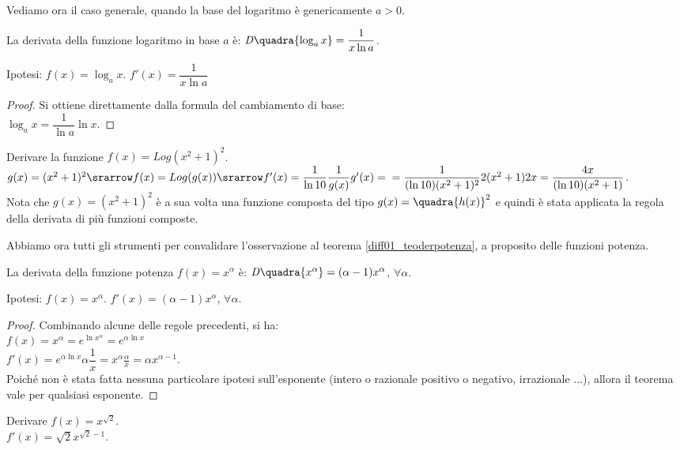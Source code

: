 Vediamo ora il caso generale, quando la base del logaritmo è genericamente 
$a>0$.
\begin{teorema}
  La derivata della funzione logaritmo in base $a$ è: 
  $\mathit{D}\quadra{\log_a x}= \dfrac{1}{x\ln a}$.
\end{teorema}
\noindent Ipotesi: $f(x)=\log_a x$. \tab $f'(x)=\dfrac{1}{x\ln a}$
\begin{proof}
Si ottiene direttamente dalla formula del cambiamento di base:\\
$\log_a x=\dfrac{1}{\ln a}\ln x$.
\end{proof}

\begin{esempio}
    Derivare la funzione $f(x)=Log(x^2+1)^2$.\\
    $g(x)=(x^2+1)^2\srarrow f(x)=Log (g(x))\srarrow f'(x)=\dfrac{1}{\ln 10}
    \dfrac{1}{g(x)}g'(x)=\\
    =\dfrac{1}{(\ln 10)(x^2+1)^2}2(x^2+1)2x=\dfrac{4x}{(\ln 10)(x^2+1)}$.\\
    Nota che $g(x)=(x^2+1)^2$ è a sua volta una funzione composta del tipo 
    $g(x)=\quadra{h(x)}^2$ e quindi è stata applicata la regola della derivata
    di più funzioni composte.
\end{esempio}

Abbiamo ora tutti gli strumenti per convalidare l'osservazione al teorema 
\ref{diff01_teoderpotenza}, a proposito delle funzioni potenza.

\begin{teorema}
  La derivata della funzione potenza $f(x)=x^\alpha$ è: \hspace{5mm}
  $\mathit{D}\quadra{x^\alpha}=(\alpha-1)x^\alpha$, $\forall\alpha$.
\end{teorema}
\noindent Ipotesi: $f(x)=x^\alpha$. \tab $f'(x)=(\alpha-1)x^\alpha$, 
$\forall \alpha$.
\begin{proof}
Combinando alcune delle regole precedenti, si ha:\\
$f(x)=x^\alpha=e^{\ln x^\alpha}=e^{\alpha\ln x}$\\
$f'(x)=e^{\alpha\ln x}\alpha\dfrac{1}{x}=x^\alpha\frac{\alpha}{x}=
\alpha x^{\alpha-1}$.\\
Poiché non è stata fatta nessuna particolare ipotesi sull'esponente (intero 
o 
razionale positivo o negativo, irrazionale ...), allora il teorema vale per 
qualsiasi esponente.
\end{proof}

\begin{esempio}
  Derivare $f(x)=x^{\sqrt{2}}$.\\
  $f'(x)=\sqrt{2}x^{\sqrt{2}-1}$.
\end{esempio}


